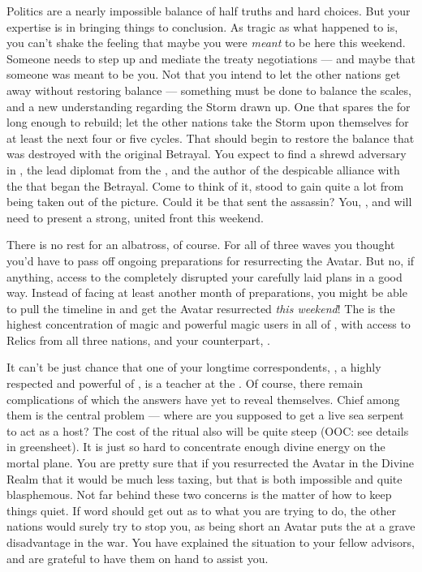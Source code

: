 \documentclass[char]{GL2020}
\begin{document}
Politics are a nearly impossible balance of half truths and hard choices. But your expertise is in bringing things to conclusion. As tragic as what happened to \cHeadDiplomat{} is, you can't shake the feeling that maybe you were \emph{meant} to be here this weekend. Someone needs to step up and mediate the treaty negotiations — and maybe that someone was meant to be you. Not that you intend to let the other nations get away without restoring balance — something must be done to balance the scales, and a new understanding regarding the Storm drawn up. One that spares the \pShip{} for long enough to rebuild; let the other nations take the Storm upon themselves for at least the next four or five cycles. That should begin to restore the balance that was destroyed with the original Betrayal. You expect to find a shrewd adversary in \cDiplomat{\intro}, the lead diplomat from the \pTech{}, and the author of the despicable alliance with the \pFarm{} that began the Betrayal. Come to think of it, \cDiplomat{} stood to gain quite a lot from \cHeadDiplomat{} being taken out of the picture. Could it be that \cDiplomat{\they} sent the assassin? You, \cJuniorStatesman{}, and \cChupLeader{} will need to present a strong, united front this weekend.

There is no rest for an albatross, of course. For all of three waves you thought you’d have to pass off ongoing preparations for resurrecting the \cEbb{} Avatar. But no, if anything, access to the \pSchool{} completely disrupted your carefully laid plans in a good way. Instead of facing at least another month of preparations, you might be able to pull the timeline in and get the Avatar resurrected \emph{this weekend}! The \pSc{} is the highest concentration of magic and powerful magic users in all of \pEarth{}, with access to Relics from all three nations, and your counterpart, \cFlowPriest{\full}.

It can't be just chance that one of your longtime correspondents, \cFlowPriest{}, a highly respected and powerful \cFlowPriest{\cleric} of \cFlowFull{\intro}, is a teacher at the \pSchool{}. Of course, there remain complications of which the answers have yet to reveal themselves. Chief among them is the central problem — where are you supposed to get a live sea serpent to act as a host? The cost of the ritual also will be quite steep (OOC: see details in greensheet). It is just so hard to concentrate enough divine energy on the mortal plane. You are pretty sure that if you resurrected the Avatar in the Divine Realm that it would be much less taxing, but that is both impossible and quite blasphemous. Not far behind these two concerns is the matter of how to keep things quiet. If word should get out as to what you are trying to do, the other nations would surely try to stop you, as being short an Avatar puts the \pShippies{} at a grave disadvantage in the war. You have explained the situation to your fellow \pShip{} advisors, and are grateful to have them on hand to assist you.
\end{document}
